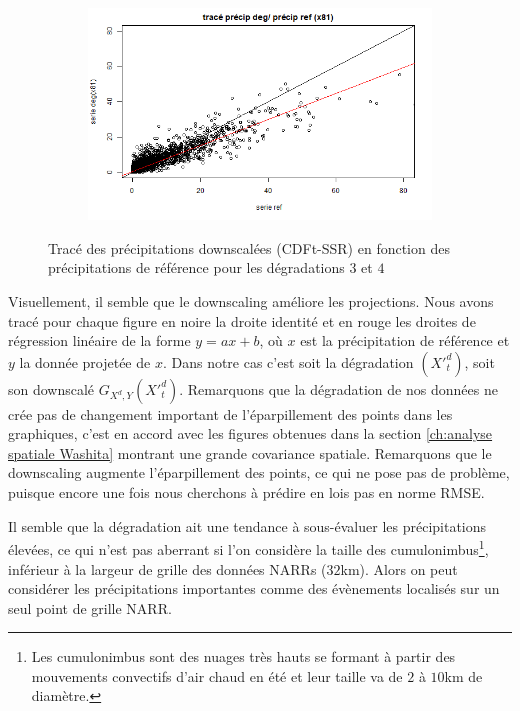 \documentclass[a4paper,11pt]{article}
\numberwithin{equation}{section}
\begin{document}
\begin{figure}[H]
\begin{subfigure}[b]{0.45\textwidth}
	\end{subfigure}
	\hfill
	\begin{subfigure}[b]{0.45\textwidth}
		\includegraphics[scale=0.35]{images/pr_4_dg.png}
	\end{subfigure}
	\caption{Tracé des précipitations downscalées (CDFt-SSR) en fonction des précipitations de référence pour les dégradations $3$ et $4$}
\end{figure} 

Visuellement, il semble que le downscaling améliore les projections. Nous avons tracé pour chaque figure en noire la droite identité et en rouge les droites de régression linéaire de la forme $y=ax+b$, où $x$ est la précipitation de référence et $y$ la donnée projetée de $x$. Dans notre cas c'est soit la dégradation $(X'^d_t)$, soit son downscalé $G_{X^d,Y}(X'^{d}_t)$. Remarquons que la dégradation de nos données ne crée pas de changement important de l'éparpillement des points dans les graphiques, c'est en accord avec les figures obtenues dans la section \ref{ch:analyse spatiale Washita} montrant une grande covariance spatiale.
Remarquons que le downscaling augmente l'éparpillement des points, ce qui ne pose pas de problème, puisque encore une fois nous cherchons à prédire en lois pas en norme RMSE.

Il semble que la dégradation ait une tendance à sous-évaluer les précipitations élevées, ce qui n'est pas aberrant si l'on considère la taille des cumulonimbus\footnote{Les cumulonimbus sont des nuages très hauts se formant à partir des mouvements convectifs d'air chaud en été et leur taille va de $2$ à $10$km de diamètre.}, inférieur à la largeur de grille des données NARRs ($32$km). Alors on peut considérer les précipitations importantes comme des évènements localisés sur un seul point de grille NARR.
\end{document}
